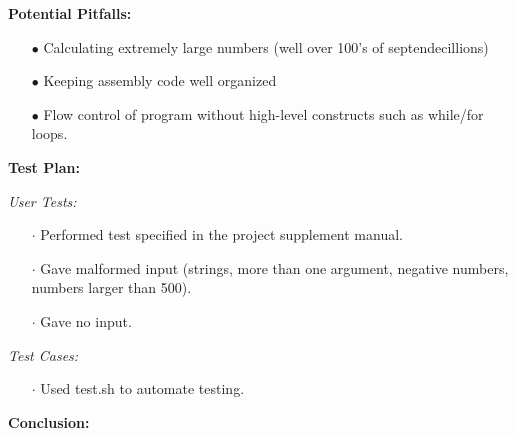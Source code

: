 \documentclass{article}
\begin{document}
\begin{flushleft}
\textbf{Potential Pitfalls:}
\vspace{.5pc}
\end{flushleft}

\begin{itemize}
	\item[$\bullet$] Calculating extremely large numbers (well over 100's of 
	septendecillions)
	\item[$\bullet$] Keeping assembly code well organized
	\item[$\bullet$] Flow control of program without high-level constructs 
	such as while/for loops.
\end{itemize}
\vspace{.5pc}

\begin{flushleft}
\textbf{Test Plan:}
\vspace{.5pc}
\end{flushleft}

\textit{User Tests:}
\begin{itemize}
	\item[$\cdot$] Performed test specified in the project supplement manual.
	\item[$\cdot$] Gave malformed input (strings, more than one argument, 
	negative numbers, numbers larger than 500).
	\item[$\cdot$] Gave no input.
\end{itemize}

\textit{Test Cases:}
\begin{itemize}
	\item[$\cdot$] Used test.sh to automate testing.
	\end{itemize}
\vspace{.5pc}

\begin{flushleft}
\textbf{Conclusion:}
\vspace{.5pc}
\end{flushleft}
\end{document}
